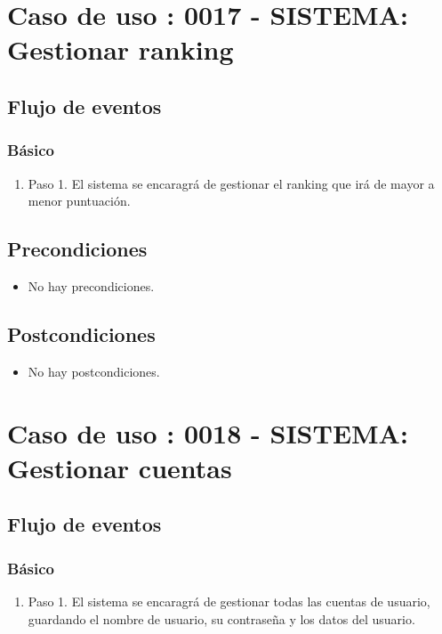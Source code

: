\section{Caso de uso : 0017 - SISTEMA: Gestionar ranking}\label{sec:uc0}
\subsection{Flujo de eventos}
\subsubsection{Básico}

\begin{enumerate}
\item Paso 1.
El sistema se encaragrá de gestionar el ranking que irá de mayor a menor puntuación.
\end{enumerate}

\subsection{Precondiciones}
\begin{itemize}
\item No hay precondiciones.
\end{itemize}

\subsection{Postcondiciones}
\begin{itemize}
\item No hay postcondiciones.
\end{itemize}



\section{Caso de uso : 0018 - SISTEMA: Gestionar cuentas}\label{sec:uc0}
\subsection{Flujo de eventos}
\subsubsection{Básico}

\begin{enumerate}
\item Paso 1.
El sistema se encaragrá de gestionar todas las cuentas de usuario, guardando el nombre de usuario, su contraseña y los datos del usuario.
\end{enumerate}

